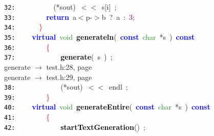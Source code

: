 \documentclass{article}
\begin{document}
\mbox{}\texttt{\textcolor{Black}{32:}} \ \ \ \ \ \ \ \ \ \ \textcolor{BrickRed}{(*}sout\textcolor{BrickRed}{)}\ \textcolor{BrickRed}{$<$$<$}\ s\textcolor{BrickRed}{[}i\textcolor{BrickRed}{]}\ \textcolor{BrickRed}{;} \\
\mbox{}\texttt{\textcolor{Black}{33:}} \ \ \ \ \ \ \ \ \textbf{\textcolor{Blue}{return}}\ a\textcolor{BrickRed}{$<$}p\textcolor{BrickRed}{-$>$}b\ \textcolor{BrickRed}{?}\ a\ \textcolor{BrickRed}{:}\ \textcolor{Purple}{3}\textcolor{BrickRed}{;} \\
\mbox{}\texttt{\textcolor{Black}{34:}} \ \ \ \ \ \ \textcolor{Red}{\}} \\
\mbox{}\texttt{\textcolor{Black}{35:}} \ \ \ \ \textbf{\textcolor{Blue}{virtual}}\ \textcolor{ForestGreen}{void}\ \textbf{\textcolor{Black}{\label{test.h:35}generateln}}\textcolor{BrickRed}{(}\ \textbf{\textcolor{Blue}{const}}\ \textcolor{ForestGreen}{char}\ \textcolor{BrickRed}{*}s\ \textcolor{BrickRed}{)}\ \textbf{\textcolor{Blue}{const}} \\
\mbox{}\texttt{\textcolor{Black}{36:}} \ \ \ \ \ \ \ \ \textcolor{Red}{\{}\  \\
\mbox{}\texttt{\textcolor{Black}{37:}} \ \ \ \ \ \ \ \ \ \ \ \ \textbf{\textcolor{Black}{generate}}\textcolor{BrickRed}{(}\ s\ \textcolor{BrickRed}{)}\ \textcolor{BrickRed}{;} \\
\mbox{}{\hfill generate $\rightarrow$ test.h:28, page~\pageref{test.h:28}} \\
\mbox{}{\hfill generate $\rightarrow$ test.h:29, page~\pageref{test.h:29}} \\
\mbox{}\texttt{\textcolor{Black}{38:}} \ \ \ \ \ \ \ \ \ \ \ \ \textcolor{BrickRed}{(*}sout\textcolor{BrickRed}{)}\ \textcolor{BrickRed}{$<$$<$}\ endl\ \textcolor{BrickRed}{;}\  \\
\mbox{}\texttt{\textcolor{Black}{39:}} \ \ \ \ \ \ \ \ \textcolor{Red}{\}} \\
\mbox{}\texttt{\textcolor{Black}{40:}} \ \ \ \ \textbf{\textcolor{Blue}{virtual}}\ \textcolor{ForestGreen}{void}\ \textbf{\textcolor{Black}{\label{test.h:40}generateEntire}}\textcolor{BrickRed}{(}\ \textbf{\textcolor{Blue}{const}}\ \textcolor{ForestGreen}{char}\ \textcolor{BrickRed}{*}s\ \textcolor{BrickRed}{)}\ \textbf{\textcolor{Blue}{const}} \\
\mbox{}\texttt{\textcolor{Black}{41:}} \ \ \ \ \ \ \ \ \textcolor{Red}{\{} \\
\mbox{}\texttt{\textcolor{Black}{42:}} \ \ \ \ \ \ \ \ \ \ \ \ \textbf{\textcolor{Black}{startTextGeneration}}\textcolor{BrickRed}{()}\ \textcolor{BrickRed}{;} \\
\end{document}
